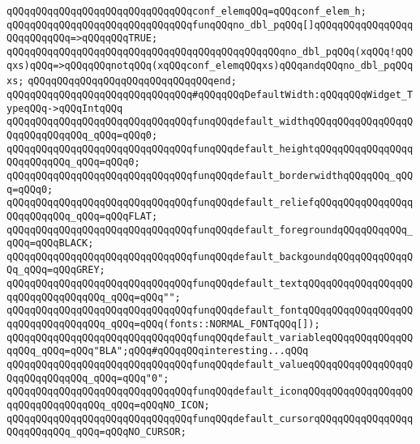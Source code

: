 \newline
\verb|qQQqqQQqqQQqqQQqqQQqqQQqqQQqqQQqconf_elemqQQq=qQQqconf_elem_h;|\newline
\newline
\verb|qQQqqQQqqQQqqQQqqQQqqQQqqQQqqQQqfunqQQqno_dbl_pqQQq[]qQQqqQQqqQQqqQQqqQQqqQQqqQQq=>qQQqqQQqTRUE;|\newline
\verb|qQQqqQQqqQQqqQQqqQQqqQQqqQQqqQQqqQQqqQQqqQQqqQQqno_dbl_pqQQq(xqQQq!qQQqxs)qQQq=>qQQqqQQqnotqQQq(xqQQqconf_elemqQQqxs)qQQqandqQQqno_dbl_pqQQqxs;|\newline
\verb|qQQqqQQqqQQqqQQqqQQqqQQqqQQqqQQqend;|\newline
\newline
\verb|qQQqqQQqqQQqqQQqqQQqqQQqqQQqqQQq#qQQqqQQqDefaultWidth:qQQqqQQqWidget_TypeqQQq->qQQqIntqQQq|\newline
\verb|qQQqqQQqqQQqqQQqqQQqqQQqqQQqqQQqfunqQQqdefault_widthqQQqqQQqqQQqqQQqqQQqqQQqqQQqqQQq_qQQq=qQQq0;|\newline
\verb|qQQqqQQqqQQqqQQqqQQqqQQqqQQqqQQqfunqQQqdefault_heightqQQqqQQqqQQqqQQqqQQqqQQqqQQq_qQQq=qQQq0;|\newline
\verb|qQQqqQQqqQQqqQQqqQQqqQQqqQQqqQQqfunqQQqdefault_borderwidthqQQqqQQq_qQQq=qQQq0;|\newline
\verb|qQQqqQQqqQQqqQQqqQQqqQQqqQQqqQQqfunqQQqdefault_reliefqQQqqQQqqQQqqQQqqQQqqQQqqQQq_qQQq=qQQqFLAT;|\newline
\verb|qQQqqQQqqQQqqQQqqQQqqQQqqQQqqQQqfunqQQqdefault_foregroundqQQqqQQqqQQq_qQQq=qQQqBLACK;|\newline
\verb|qQQqqQQqqQQqqQQqqQQqqQQqqQQqqQQqfunqQQqdefault_backgoundqQQqqQQqqQQqqQQq_qQQq=qQQqGREY;|\newline
\verb|qQQqqQQqqQQqqQQqqQQqqQQqqQQqqQQqfunqQQqdefault_textqQQqqQQqqQQqqQQqqQQqqQQqqQQqqQQqqQQq_qQQq=qQQq"";|\newline
\verb|qQQqqQQqqQQqqQQqqQQqqQQqqQQqqQQqfunqQQqdefault_fontqQQqqQQqqQQqqQQqqQQqqQQqqQQqqQQqqQQq_qQQq=qQQq(fonts::NORMAL_FONTqQQq[]);|\newline
\verb|qQQqqQQqqQQqqQQqqQQqqQQqqQQqqQQqfunqQQqdefault_variableqQQqqQQqqQQqqQQqqQQq_qQQq=qQQq"BLA";qQQq#qQQqqQQqinteresting...qQQq|\newline
\verb|qQQqqQQqqQQqqQQqqQQqqQQqqQQqqQQqfunqQQqdefault_valueqQQqqQQqqQQqqQQqqQQqqQQqqQQqqQQq_qQQq=qQQq"0";|\newline
\verb|qQQqqQQqqQQqqQQqqQQqqQQqqQQqqQQqfunqQQqdefault_iconqQQqqQQqqQQqqQQqqQQqqQQqqQQqqQQqqQQq_qQQq=qQQqNO_ICON;|\newline
\verb|qQQqqQQqqQQqqQQqqQQqqQQqqQQqqQQqfunqQQqdefault_cursorqQQqqQQqqQQqqQQqqQQqqQQqqQQq_qQQq=qQQqNO_CURSOR;|\newline
